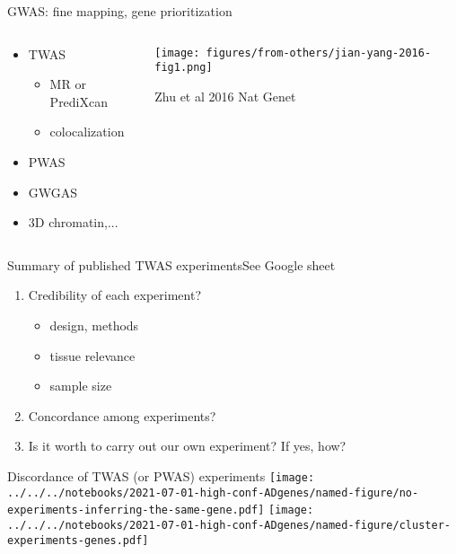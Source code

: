 \documentclass[aspectratio=169]{beamer}
\begin{document}
\begin{frame}{GWAS: fine mapping, gene prioritization}
\begin{columns}[t]
\begin{column}{0.4\textwidth}
\begin{itemize}
\item TWAS
\begin{itemize}
\item MR or PrediXcan
\item colocalization
\end{itemize}
\item PWAS
\item GWGAS
\item 3D chromatin,...
\end{itemize}
\end{column}

\begin{column}{0.7\textwidth}

\texttt{[image: figures/from-others/jian-yang-2016-fig1.png]}

{\tiny Zhu et al 2016 Nat Genet}
\end{column}
\end{columns}
\end{frame}

\begin{frame}{Summary of published TWAS experiments}{See Google sheet}
\begin{enumerate}
\item Credibility of each experiment?
\begin{itemize}
	\item design, methods
	\item tissue relevance
	\item sample size
\end{itemize}
\item Concordance among experiments?
\item Is it worth to carry out our own experiment?  If yes, how?
\end{enumerate}
\end{frame}

\begin{frame}{Discordance of TWAS (or PWAS) experiments}
\texttt{[image: ../../../notebooks/2021-07-01-high-conf-ADgenes/named-figure/no-experiments-inferring-the-same-gene.pdf]}
\texttt{[image: ../../../notebooks/2021-07-01-high-conf-ADgenes/named-figure/cluster-experiments-genes.pdf]}
\end{frame}
\end{document}
